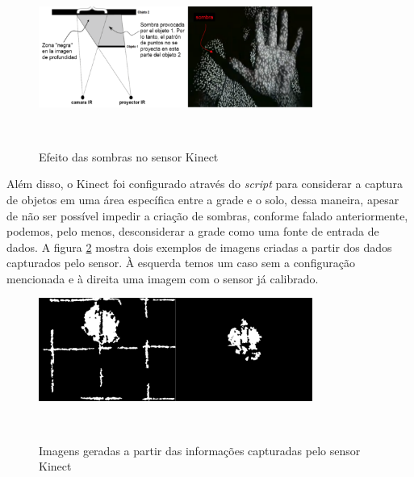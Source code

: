 \begin{figure}[H]
  \begin{center}
    \caption{Efeito das sombras no sensor Kinect}
    \vspace*{0,2cm}
    \includegraphics[width=0.8\textwidth]{./04-figuras/kinect_sombras}
    \label{fig:kinect_sombras}
  \end{center}
  \vspace*{-0,9cm}
  \\
\end{figure}

Além disso, o Kinect foi configurado através do \textit{script} para considerar a captura de objetos em uma área específica entre a grade e o solo, dessa maneira, apesar de não ser possível impedir a criação de sombras, conforme falado anteriormente, podemos, pelo menos, desconsiderar a grade como uma fonte de entrada de dados. A figura \ref{fig:kinect_exemplo} mostra dois exemplos de imagens criadas a partir dos dados capturados pelo sensor. À esquerda temos um caso sem a configuração mencionada e à direita uma imagem com o sensor já calibrado.

\begin{figure}[H]
  \begin{center}
    \caption{Imagens geradas a partir das informações capturadas pelo sensor Kinect}
    \vspace*{0,2cm}
    \includegraphics[width=0.8\textwidth]{./04-figuras/kinect_exemplo}
    \label{fig:kinect_exemplo}
  \end{center}
  \vspace*{-0,9cm}
  \\
\end{figure}


